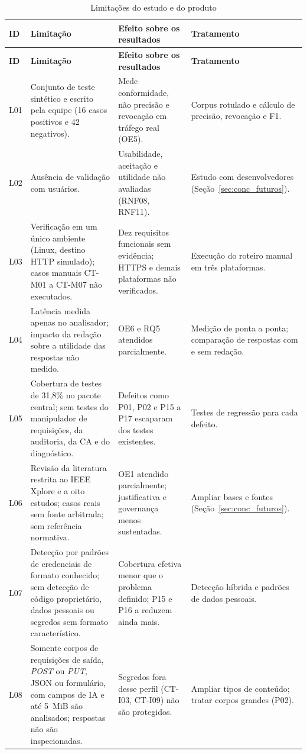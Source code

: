{\small
\begin{longtable}{|p{1.0cm}|p{6.3cm}|p{4.1cm}|p{3.3cm}|}
\caption{Limitações do estudo e do produto}\label{tab:limitacoes}\\
\hline
\textbf{ID} & \textbf{Limitação} & \textbf{Efeito sobre os resultados} & \textbf{Tratamento} \\ \hline
\endfirsthead
\hline
\textbf{ID} & \textbf{Limitação} & \textbf{Efeito sobre os resultados} & \textbf{Tratamento} \\ \hline
\endhead
L01 & Conjunto de teste sintético e escrito pela equipe (16 casos positivos e 42 negativos). & Mede conformidade, não precisão e revocação em tráfego real (OE5). & Corpus rotulado e cálculo de precisão, revocação e F1. \\ \hline
L02 & Ausência de validação com usuários. & Usabilidade, aceitação e utilidade não avaliadas (RNF08, RNF11). & Estudo com desenvolvedores (Seção~\ref{sec:conc_futuros}). \\ \hline
L03 & Verificação em um único ambiente (Linux, destino HTTP simulado); casos manuais CT-M01 a CT-M07 não executados. & Dez requisitos funcionais sem evidência; HTTPS e demais plataformas não verificados. & Execução do roteiro manual em três plataformas. \\ \hline
L04 & Latência medida apenas no analisador; impacto da redação sobre a utilidade das respostas não medido. & OE6 e RQ5 atendidos parcialmente. & Medição de ponta a ponta; comparação de respostas com e sem redação. \\ \hline
L05 & Cobertura de testes de 31,8\% no pacote central; sem testes do manipulador de requisições, da auditoria, da CA e do diagnóstico. & Defeitos como P01, P02 e P15 a P17 escaparam dos testes existentes. & Testes de regressão para cada defeito. \\ \hline
L06 & Revisão da literatura restrita ao IEEE Xplore e a oito estudos; casos reais sem fonte arbitrada; sem referência normativa. & OE1 atendido parcialmente; justificativa e governança menos sustentadas. & Ampliar bases e fontes (Seção~\ref{sec:conc_futuros}). \\ \hline
L07 & Detecção por padrões de credenciais de formato conhecido; sem detecção de código proprietário, dados pessoais ou segredos sem formato característico. & Cobertura efetiva menor que o problema definido; P15 e P16 a reduzem ainda mais. & Detecção híbrida e padrões de dados pessoais. \\ \hline
L08 & Somente corpos de requisições de saída, \textit{POST} ou \textit{PUT}, JSON ou formulário, com campos de IA e até 5~MiB são analisados; respostas não são inspecionadas. & Segredos fora desse perfil (CT-I03, CT-I09) não são protegidos. & Ampliar tipos de conteúdo; tratar corpos grandes (P02). \\ \hline

\end{longtable}}
